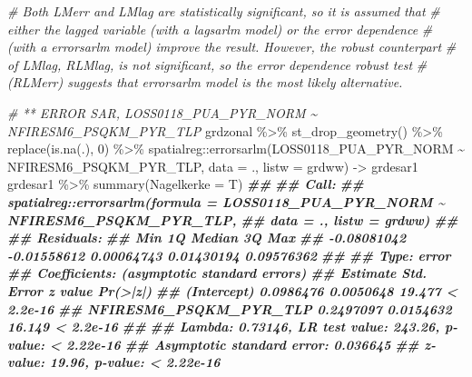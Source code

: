 \documentclass[10pt,landscape,a3paper]{article}
\newenvironment{Shaded}{\begin{snugshade}}{\end{snugshade}}
\newcommand{\AttributeTok}[1]{\textcolor[rgb]{0.77,0.63,0.00}{#1}}
\newcommand{\CommentTok}[1]{\textcolor[rgb]{0.56,0.35,0.01}{\textit{#1}}}
\newcommand{\DecValTok}[1]{\textcolor[rgb]{0.00,0.00,0.81}{#1}}
\newcommand{\DocumentationTok}[1]{\textcolor[rgb]{0.56,0.35,0.01}{\textbf{\textit{#1}}}}
\newcommand{\FunctionTok}[1]{\textcolor[rgb]{0.00,0.00,0.00}{#1}}
\newcommand{\NormalTok}[1]{#1}
\newcommand{\OtherTok}[1]{\textcolor[rgb]{0.56,0.35,0.01}{#1}}
\newcommand{\SpecialCharTok}[1]{\textcolor[rgb]{0.00,0.00,0.00}{#1}}
\begin{document}
\begin{Shaded}
\begin{Highlighting}[]
\CommentTok{\# Both LMerr and LMlag are statistically significant, so it is assumed that}
\CommentTok{\# either the lagged variable (with a lagsarlm model) or the error dependence}
\CommentTok{\# (with a errorsarlm model) improve the result. However, the robust counterpart}
\CommentTok{\# of LMlag, RLMlag, is not significant, so the error dependence robust test}
\CommentTok{\# (RLMerr) suggests that errorsarlm model is the most likely alternative.}

\CommentTok{\# ** ERROR SAR, LOSS0118\_PUA\_PYR\_NORM \textasciitilde{} NFIRESM6\_PSQKM\_PYR\_TLP}
\NormalTok{grdzonal }\SpecialCharTok{\%\textgreater{}\%}
    \FunctionTok{st\_drop\_geometry}\NormalTok{() }\SpecialCharTok{\%\textgreater{}\%}
    \FunctionTok{replace}\NormalTok{(}\FunctionTok{is.na}\NormalTok{(.), }\DecValTok{0}\NormalTok{) }\SpecialCharTok{\%\textgreater{}\%}
\NormalTok{    spatialreg}\SpecialCharTok{::}\FunctionTok{errorsarlm}\NormalTok{(LOSS0118\_PUA\_PYR\_NORM }\SpecialCharTok{\textasciitilde{}}\NormalTok{ NFIRESM6\_PSQKM\_PYR\_TLP, }\AttributeTok{data =}\NormalTok{ .,}
        \AttributeTok{listw =}\NormalTok{ grdww) }\OtherTok{{-}\textgreater{}}\NormalTok{ grdesar1}
\NormalTok{grdesar1 }\SpecialCharTok{\%\textgreater{}\%}
    \FunctionTok{summary}\NormalTok{(}\AttributeTok{Nagelkerke =}\NormalTok{ T)}
\DocumentationTok{\#\# }
\DocumentationTok{\#\# Call:}
\DocumentationTok{\#\# spatialreg::errorsarlm(formula = LOSS0118\_PUA\_PYR\_NORM \textasciitilde{} NFIRESM6\_PSQKM\_PYR\_TLP, }
\DocumentationTok{\#\#     data = ., listw = grdww)}
\DocumentationTok{\#\# }
\DocumentationTok{\#\# Residuals:}
\DocumentationTok{\#\#         Min          1Q      Median          3Q         Max }
\DocumentationTok{\#\# {-}0.08081042 {-}0.01558612  0.00064743  0.01430194  0.09576362 }
\DocumentationTok{\#\# }
\DocumentationTok{\#\# Type: error }
\DocumentationTok{\#\# Coefficients: (asymptotic standard errors) }
\DocumentationTok{\#\#                         Estimate Std. Error z value  Pr(\textgreater{}|z|)}
\DocumentationTok{\#\# (Intercept)            0.0986476  0.0050648  19.477 \textless{} 2.2e{-}16}
\DocumentationTok{\#\# NFIRESM6\_PSQKM\_PYR\_TLP 0.2497097  0.0154632  16.149 \textless{} 2.2e{-}16}
\DocumentationTok{\#\# }
\DocumentationTok{\#\# Lambda: 0.73146, LR test value: 243.26, p{-}value: \textless{} 2.22e{-}16}
\DocumentationTok{\#\# Asymptotic standard error: 0.036645}
\DocumentationTok{\#\#     z{-}value: 19.96, p{-}value: \textless{} 2.22e{-}16}

\end{Highlighting}
\end{Shaded}
\end{document}
